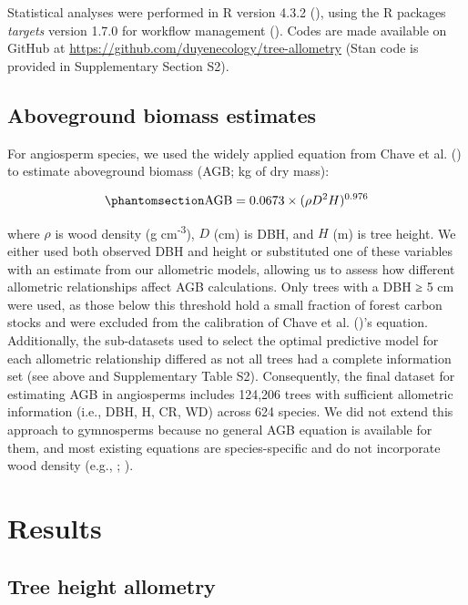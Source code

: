\documentclass[
  12pt,
  letterpaper,
  DIV=11,
  numbers=noendperiod]{scrartcl}
\begin{document}
Statistical analyses were performed in R version 4.3.2
(), using the R packages
\emph{targets} version 1.7.0 for workflow management
(). Codes are made available on
GitHub at \url{https://github.com/duyenecology/tree-allometry} (Stan
code is provided in Supplementary Section S2).

\subsection{Aboveground biomass
estimates}\label{aboveground-biomass-estimates}

For angiosperm species, we used the widely applied equation from Chave
et al. () to estimate aboveground biomass
(AGB; kg of dry mass):

\begin{equation}\phantomsection\label{eq-agb}{
\mathrm{AGB} = 0.0673 \times (\rho D^2H)^{0.976}
}\end{equation}

where \(\rho\) is wood density (g cm\textsuperscript{-3}), \(D\) (cm) is
DBH, and \(H\) (m) is tree height. We either used both observed DBH and
height or substituted one of these variables with an estimate from our
allometric models, allowing us to assess how different allometric
relationships affect AGB calculations. Only trees with a DBH ≥ 5 cm were
used, as those below this threshold hold a small fraction of forest
carbon stocks and were excluded from the calibration of Chave et al.
()'s equation. Additionally, the
sub-datasets used to select the optimal predictive model for each
allometric relationship differed as not all trees had a complete
information set (see above and Supplementary Table S2). Consequently,
the final dataset for estimating AGB in angiosperms includes 124,206
trees with sufficient allometric information (i.e., DBH, H, CR, WD)
across 624 species. We did not extend this approach to gymnosperms
because no general AGB equation is available for them, and most existing
equations are species-specific and do not incorporate wood density
(e.g., ;
).

\section{Results}\label{results}

\subsection{Tree height allometry}\label{tree-height-allometry}
\end{document}
